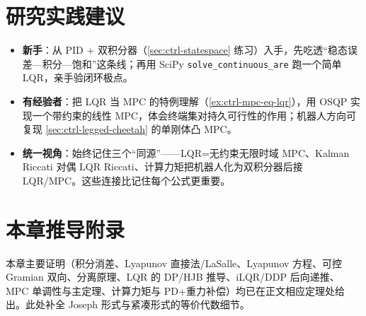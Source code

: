 \section*{研究实践建议}
\begin{itemize}
  \item \textbf{新手}：从 PID + 双积分器（\cref{sec:ctrl-statespace} 练习）入手，先吃透“稳态误差—积分—饱和”这条线；再用 SciPy \texttt{solve\_continuous\_are} 跑一个简单 LQR，亲手验闭环极点。
  \item \textbf{有经验者}：把 LQR 当 MPC 的特例理解（\cref{ex:ctrl-mpc-eq-lqr}），用 OSQP 实现一个带约束的线性 MPC，体会终端集对持久可行性的作用；机器人方向可复现 \cref{sec:ctrl-legged-cheetah} 的单刚体凸 MPC。
  \item \textbf{统一视角}：始终记住三个“同源”——LQR=无约束无限时域 MPC、Kalman Riccati 对偶 LQR Riccati、计算力矩把机器人化为双积分器后接 LQR/MPC。这些连接比记住每个公式更重要。
\end{itemize}

\section{本章推导附录}
\label{sec:ctrl-appendix}

本章主要证明（积分消差、Lyapunov 直接法/LaSalle、Lyapunov 方程、可控 Gramian 双向、分离原理、LQR 的 DP/HJB 推导、iLQR/DDP 后向递推、MPC 单调性与主定理、计算力矩与 PD+重力补偿）均已在正文相应定理处给出。此处补全 Joseph 形式与紧凑形式的等价代数细节。

